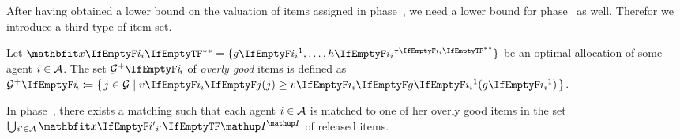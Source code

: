 After having obtained a lower bound on the valuation of items assigned in phase~\phaseii, we need a lower bound for phase~\phaseiii{} as well.
Therefor we introduce a third type of item set.
\begin{definition}
	Let \(\alloc* = \{ \asgd*{1}, \dots, \asgd{\alloclen*}\}\) be an optimal allocation of some agent \(i \in \mathcal{A}\).
	The set \(\overlygoodset\) of \emph{overly good} items is defined as \(\overlygoodset \coloneq \{\, j \in \goods \given \valuations[j] \ge \valuations[\asgd*{1}] \,\}\).
\end{definition}

\begin{lemma}
	\label{lem:overly_good_matching}
	In phase~\phaseiii, there exists a matching such that each agent \(i \in \mathcal{A}\) is matched to one of her overly good items in the set \(\mathop{\bigcup\hspace{-1pt}_{i' \in \agents}} \alloc[\phasei][i']\) of released items.
\end{lemma}
